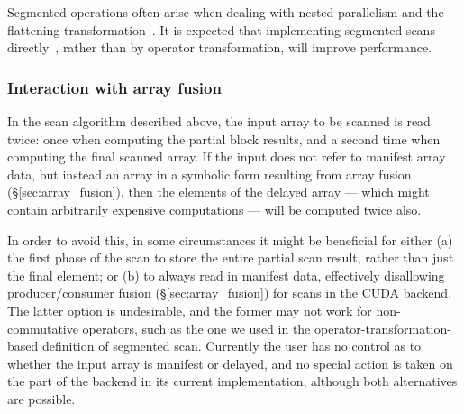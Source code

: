 Segmented operations often arise when dealing with nested parallelism and the
flattening transformation~\cite{Blelloch:1995ut}. It is expected that
implementing segmented scans directly~\cite{Sengupta:2008ut,Dotsenko:2008fo},
rather than by operator transformation, will improve performance.


\subsubsection{Interaction with array fusion}

In the scan algorithm described above, the input array to be scanned is read
twice: once when computing the partial block results, and a second time when
computing the final scanned array. If the input does not refer to manifest array
data, but instead an array in a symbolic form resulting from array
fusion\fusion{} (\S\ref{sec:array_fusion}), then the elements of the delayed
array --- which might contain arbitrarily expensive computations --- will be
computed twice also.

In order to avoid this, in some circumstances it might be beneficial for either
(a) the first phase of the scan to store the entire partial scan result, rather
than just the final element; or (b) to always read in manifest data, effectively
disallowing producer/consumer fusion\fusion{} (\S\ref{sec:array_fusion}) for
scans in the CUDA\cuda{} backend. The latter option is undesirable, and the
former may not work for non-commutative operators, such as the one we used in
the operator-transformation-based definition of segmented scan. Currently the
user has no control as to whether the input array is manifest or delayed, and no
special action is taken on the part of the backend in its current
implementation, although both alternatives are possible.




